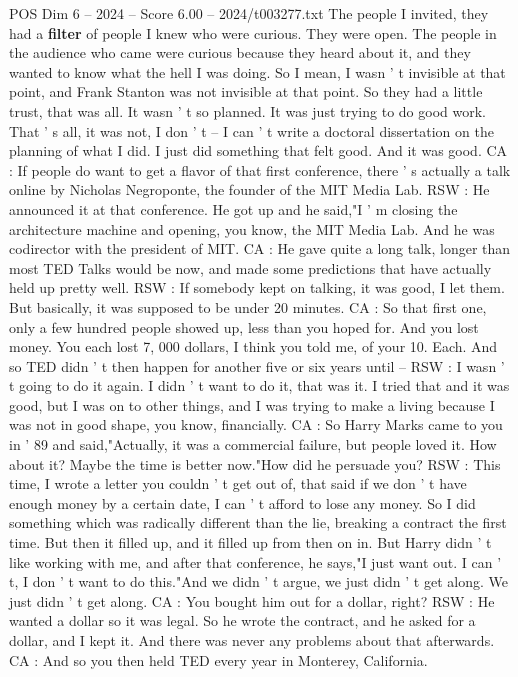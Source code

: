 \begin{textsample}{POS Dim 6 – 2024 – Score 6.00 – 2024/t003277.txt}
The people I invited, they had a \textbf{filter} of people I knew who were curious.
They were open.
The people in the audience who came were curious because they heard about it, and they wanted to know what the hell I was doing.
So I mean, I wasn ' t invisible at that point, and Frank Stanton was not invisible at that point.
So they had a little trust, that was all.
It wasn ' t so planned.
It was just trying to do good work.
That ' s all, it was not, I don ' t -- I can ' t write a doctoral dissertation on the planning of what I did.
I just did something that felt good.
And it was good.
CA : If people do want to get a flavor of that first conference, there ' s actually a talk online by Nicholas Negroponte, the founder of the MIT Media Lab.
RSW : He announced it at that conference.
He got up and he said,"I ' m closing the architecture machine and opening, you know, the MIT Media Lab.
And he was codirector with the president of MIT.
CA : He gave quite a long talk, longer than most TED Talks would be now, and made some predictions that have actually held up pretty well.
RSW : If somebody kept on talking, it was good, I let them.
But basically, it was supposed to be under 20 minutes.
CA : So that first one, only a few hundred people showed up, less than you hoped for.
And you lost money.
You each lost 7, 000 dollars, I think you told me, of your 10.
Each.
And so TED didn ' t then happen for another five or six years until -- RSW : I wasn ' t going to do it again.
I didn ' t want to do it, that was it.
I tried that and it was good, but I was on to other things, and I was trying to make a living because I was not in good shape, you know, financially.
CA : So Harry Marks came to you in ' 89 and said,"Actually, it was a commercial failure, but people loved it.
How about it?
Maybe the time is better now."How did he persuade you?
RSW : This time, I wrote a letter you couldn ' t get out of, that said if we don ' t have enough money by a certain date, I can ' t afford to lose any money.
So I did something which was radically different than the lie, breaking a contract the first time.
But then it filled up, and it filled up from then on in.
But Harry didn ' t like working with me, and after that conference, he says,"I just want out.
I can ' t, I don ' t want to do this."And we didn ' t argue, we just didn ' t get along.
We just didn ' t get along.
CA : You bought him out for a dollar, right?
RSW : He wanted a dollar so it was legal.
So he wrote the contract, and he asked for a dollar, and I kept it.
And there was never any problems about that afterwards.
CA : And so you then held TED every year in Monterey, California.

\end{textsample}
